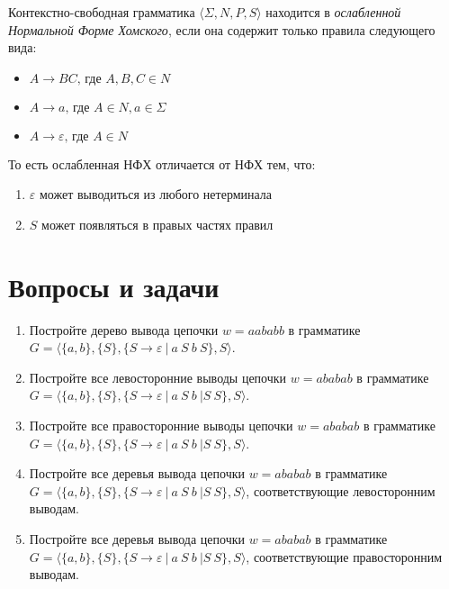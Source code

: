 \begin{definition}
Контекстно-свободная грамматика $\langle \Sigma, N, P, S\rangle$ находится в \textit{ослабленной Нормальной Форме Хомского}, если она содержит только правила следующего вида:

\begin{itemize}
  \item $A \to B C \text{, где } A, B, C \in N$
  \item $A \to a \text{, где } A \in N, a \in \Sigma$
  \item $A \to \varepsilon \text{, где } A \in N$
\end{itemize}

То есть ослабленная НФХ отличается от НФХ тем, что:
\begin{enumerate}
  \item $\varepsilon$ может выводиться из любого нетерминала
  \item $S$ может появляться в правых частях правил
\end{enumerate}
\end{definition}

\section{Вопросы и задачи}
\begin{enumerate}
  \item Постройте дерево вывода цепочки $w=aababb$ в грамматике $G=\langle\{a,b\},\{S\},\{S\rightarrow \varepsilon \ | \ a \ S \ b \ S \}, S \rangle$.
  \item Постройте все левосторонние выводы цепочки $w=ababab$ в грамматике $G=\langle\{a,b\},\{S\},\{S\rightarrow \varepsilon \ | \ a \ S \ b \ | S \ S\}, S \rangle$.
  \item Постройте все правосторонние выводы цепочки $w=ababab$ в грамматике $G=\langle\{a,b\},\{S\},\{S\rightarrow \varepsilon \ | \ a \ S \ b \ | S \ S\}, S \rangle$.
  \item \label{t1}Постройте все деревья вывода цепочки $w=ababab$ в грамматике $G=\langle\{a,b\},\{S\},\{S\rightarrow \varepsilon \ | \ a \ S \ b \ | S \ S\}, S \rangle$, соответствующие левосторонним выводам.
  \item \label{t2}Постройте все деревья вывода цепочки $w=ababab$ в грамматике $G=\langle\{a,b\},\{S\},\{S\rightarrow \varepsilon \ | \ a \ S \ b \ | S \ S\}, S \rangle$, соответствующие правосторонним выводам.
\end{enumerate}
